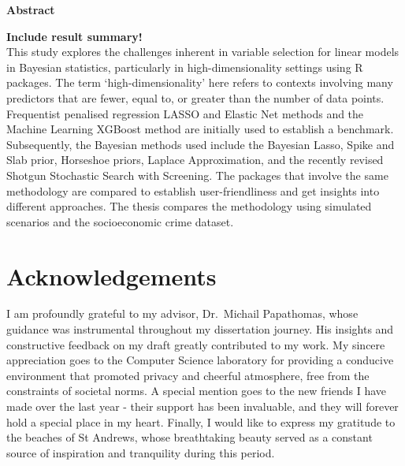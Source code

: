\documentclass[
  11pt,
]{article}
\author{}
\date{\vspace{-2.5em}}
\begin{document}
\onehalfspacing

\begin{center}
    {\Large \textbf{Abstract}}
\end{center}

\vspace{0.5cm}

\noindent 

\textbf{Include result summary!}\\
This study explores the challenges inherent in variable selection for
linear models in Bayesian statistics, particularly in
high-dimensionality settings using R packages. The term
`high-dimensionality' here refers to contexts involving many predictors
that are fewer, equal to, or greater than the number of data points.
Frequentist penalised regression LASSO and Elastic Net methods and the
Machine Learning XGBoost method are initially used to establish a
benchmark. Subsequently, the Bayesian methods used include the Bayesian
Lasso, Spike and Slab prior, Horseshoe priors, Laplace Approximation,
and the recently revised Shotgun Stochastic Search with Screening. The
packages that involve the same methodology are compared to establish
user-friendliness and get insights into different approaches. The thesis
compares the methodology using simulated scenarios and the socioeconomic
crime dataset.

\newpage

\tableofcontents

\newpage

\section{Acknowledgements}

I am profoundly grateful to my advisor, Dr.~Michail Papathomas, whose
guidance was instrumental throughout my dissertation journey. His
insights and constructive feedback on my draft greatly contributed to my
work. My sincere appreciation goes to the Computer Science laboratory
for providing a conducive environment that promoted privacy and cheerful
atmosphere, free from the constraints of societal norms. A special
mention goes to the new friends I have made over the last year - their
support has been invaluable, and they will forever hold a special place
in my heart. Finally, I would like to express my gratitude to the
beaches of St Andrews, whose breathtaking beauty served as a constant
source of inspiration and tranquility during this period.

\newpage
\end{document}
